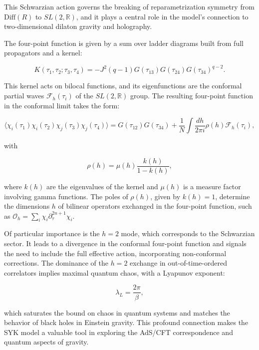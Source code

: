 This Schwarzian action governs the breaking of reparametrization symmetry from $\text{Diff}(R)$ to $SL(2, \mathbb{R})$, and it plays a central role in the model's connection to two-dimensional dilaton gravity and holography.

The four-point function is given by a sum over ladder diagrams built from full propagators and a kernel:

$$
K(\tau_1, \tau_2; \tau_3, \tau_4) = -J^2 (q-1) G(\tau_{13}) G(\tau_{24}) G(\tau_{34})^{q-2}.
$$

This kernel acts on bilocal functions, and its eigenfunctions are the conformal partial waves $\mathcal{F}_h(\tau_i)$ of the $SL(2, \mathbb{R})$ group. The resulting four-point function in the conformal limit takes the form:

$$
\langle \chi_i(\tau_1) \chi_i(\tau_2) \chi_j(\tau_3) \chi_j(\tau_4) \rangle = G(\tau_{12})G(\tau_{34}) + \frac{1}{N} \int \frac{dh}{2\pi i} \rho(h) \mathcal{F}_h(\tau_i),
$$

with

$$
\rho(h) = \mu(h) \frac{k(h)}{1 - k(h)},
$$

where $k(h)$ are the eigenvalues of the kernel and $\mu(h)$ is a measure factor involving gamma functions. The poles of $\rho(h)$, given by $k(h) = 1$, determine the dimensions $h$ of bilinear operators exchanged in the four-point function, such as $\mathcal{O}_h = \sum_i \chi_i \partial_\tau^{2n+1} \chi_i$.

Of particular importance is the $h = 2$ mode, which corresponds to the Schwarzian sector. It leads to a divergence in the conformal four-point function and signals the need to include the full effective action, incorporating non-conformal corrections. The dominance of the $h = 2$ exchange in out-of-time-ordered correlators implies maximal quantum chaos, with a Lyapunov exponent:

$$
\lambda_L = \frac{2\pi}{\beta},
$$

which saturates the bound on chaos in quantum systems and matches the behavior of black holes in Einstein gravity. This profound connection makes the SYK model a valuable tool in exploring the AdS/CFT correspondence and quantum aspects of gravity.

